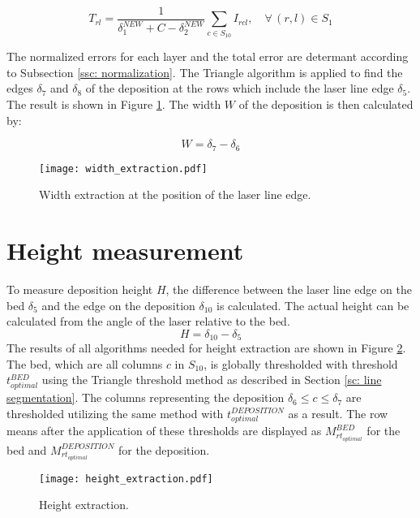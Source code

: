 \begin{equation}
T_{rl} = \frac{1}{\delta^{NEW}_1+C-\delta^{NEW}_2}  \sum_{c \in S_{10}}  I_{rcl}, \quad \forall \, (r,l) \in S_1
\end{equation}

\skippar
The normalized errors for each layer and the total error are determant according to Subsection \ref{ssc: normalization}. The Triangle algorithm is applied to find the edges $\delta_7$ and $\delta_8$ of the deposition at the rows which include the laser line edge $\delta_5$. The result is shown in Figure \ref{fig: width_extraction}. The width $W$ of the deposition is then calculated by:

\begin{equation}
W = \delta_7-\delta_6
\end{equation}
\begin{figure}[!ht]
\centering
\texttt{[image: width\_extraction.pdf]} 
\caption{Width extraction at the position of the laser line edge.}
\label{fig: width_extraction}
\end{figure}

\section{Height measurement}
To measure deposition height $H$, the difference between the laser line edge on the bed $\delta_5$ and the edge on the deposition $\delta_{10}$ is calculated. The actual height can be calculated from the angle of the laser relative to the bed. 
\begin{equation}
H = \delta_{10}-\delta_5
\end{equation}
The results of all algorithms needed for height extraction are shown in Figure \ref{fig: height_extraction}. The bed, which are all columns $c$ in $S_{10}$, is globally thresholded with threshold $t^{BED}_{optimal}$ using the Triangle threshold method as described in Section \ref{sc: line segmentation}. The columns representing the deposition $\delta_6 \leq c \leq \delta_7$ are thresholded utilizing the same method with $t^{DEPOSITION}_{optimal}$ as a result. The row means after the application of these thresholds are displayed as $M^{BED}_{rt_{optimal}}$ for the bed and $M^{DEPOSITION}_{rt_{optimal}}$ for the deposition.
\begin{figure}[!ht]
\centering
\texttt{[image: height\_extraction.pdf]} 
\caption{Height extraction.}
\label{fig: height_extraction}
\end{figure}



